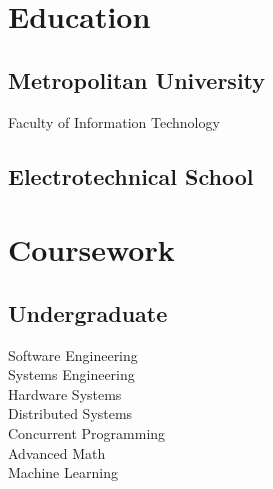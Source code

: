 \documentclass[]{matija-resume}
\begin{document}
\begin{minipage}[t]{0.33\textwidth}

\section{Education}

\subsection{Metropolitan University}
Faculty of Information Technology \\
\sectionsep

\subsection{Electrotechnical School}
\sectionsep


\section{Coursework}
\subsection{Undergraduate}
Software Engineering \\
Systems Engineering \\
Hardware Systems \\
Distributed Systems \\
Concurrent Programming \\
Advanced Math \\
Machine Learning \\
\sectionsep

%
%

\end{minipage}
\hfill
\end{document}
